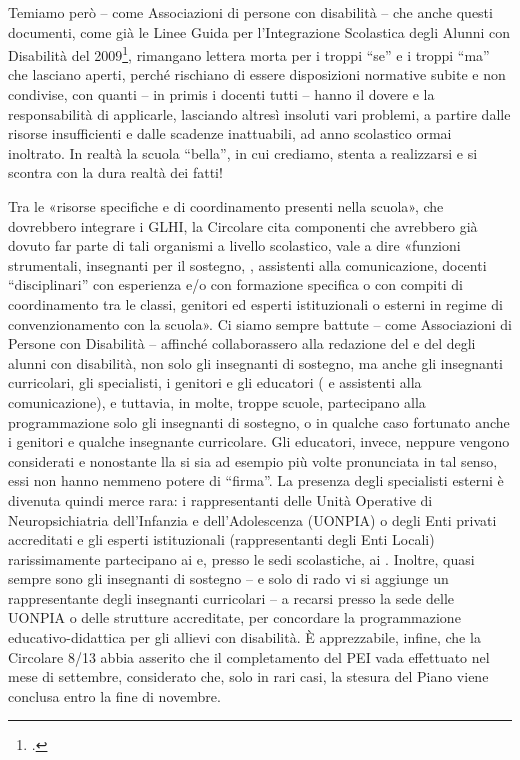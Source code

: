 Temiamo però – come Associazioni di persone con disabilità – che anche questi documenti, come già le Linee Guida per l'Integrazione Scolastica degli Alunni con Disabilità del 2009\footcite{LineGuida2009}, rimangano lettera morta per i troppi “se” e i troppi “ma” che lasciano aperti, perché rischiano di essere disposizioni normative subite e non condivise, con quanti – in primis i docenti tutti – hanno il dovere e la responsabilità di applicarle, lasciando altresì insoluti vari problemi, a partire dalle risorse insufficienti e dalle scadenze inattuabili, ad anno scolastico ormai inoltrato.
In realtà la scuola “bella”, in cui crediamo, stenta a realizzarsi e si scontra con la dura realtà dei fatti! %

Tra le «risorse specifiche e di coordinamento presenti nella scuola», che dovrebbero integrare i GLHI, la Circolare cita componenti che avrebbero già dovuto far parte di tali organismi a livello scolastico, vale a dire «funzioni strumentali, insegnanti per il sostegno, , assistenti alla comunicazione, docenti “disciplinari” con esperienza e/o con formazione specifica o con compiti di coordinamento tra le classi, genitori ed esperti istituzionali o esterni in regime di convenzionamento con la scuola».
Ci siamo sempre battute – come Associazioni di Persone con Disabilità – affinché collaborassero alla redazione del  e del  degli alunni con disabilità, non solo gli insegnanti di sostegno, ma anche gli insegnanti curricolari, gli specialisti, i genitori e gli educatori ( e assistenti alla comunicazione), e tuttavia, in molte, troppe scuole, partecipano alla programmazione solo gli insegnanti di sostegno, o in qualche caso fortunato anche i genitori e qualche insegnante curricolare. Gli educatori, invece, neppure vengono considerati e nonostante lla   si sia ad esempio più volte pronunciata in tal senso, essi non hanno nemmeno potere di “firma”.
La presenza degli specialisti esterni è divenuta quindi merce rara: i rappresentanti delle Unità Operative di Neuropsichiatria dell'Infanzia e dell'Adolescenza (UONPIA) o degli Enti privati accreditati e gli esperti istituzionali (rappresentanti degli Enti Locali) rarissimamente partecipano ai  e, presso le sedi scolastiche, ai . Inoltre, quasi sempre sono gli insegnanti di sostegno – e solo di rado vi si aggiunge un rappresentante degli insegnanti curricolari – a recarsi presso la sede delle UONPIA o delle strutture accreditate, per concordare la programmazione educativo-didattica per gli allievi con disabilità.
È apprezzabile, infine, che la Circolare 8/13 abbia asserito che il completamento del PEI vada effettuato nel mese di settembre, considerato che, solo in rari casi, la stesura del Piano viene conclusa entro la fine di novembre.
